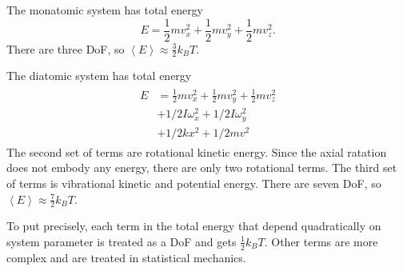 \begin{example}
	The monatomic system has total energy \[
	E = \frac{1}{2} m v_x^2+ \frac{1}{2} m v_y^2 + \frac{1}{2} m v_z^2
	.\] 
	There are three DoF, so $\left\langle E \right\rangle  \approx \frac{3}{2} k_B T$.
\end{example}
\begin{example}
	The diatomic system has total energy
	\begin{align*}
		\begin{split}
			E &= \frac{1}{2} m v_x^2+ \frac{1}{2} m v_y^2 + \frac{1}{2} m v_z^2
		       \\ &+ 1/2I \omega_x^2+ 1/2I \omega_y^2
		       \\ &+ 1/2k x^2+ 1/2m v^2
\end{split} 
	\end{align*}
	The second set of terms are rotational kinetic energy. Since the axial ratation does not embody any energy, there are only two rotational terms. The third set of terms is vibrational kinetic and potential energy.
	There are seven DoF, so $\left\langle E \right\rangle  \approx \frac{7}{2} k_B T$.
\end{example}

\begin{remark}
	To put precisely, each term in the total energy that depend quadratically on system parameter is treated as a DoF and gets $\frac{1}{2}k_B T$. Other terms are more complex and are treated in statistical mechanics.
\end{remark}
